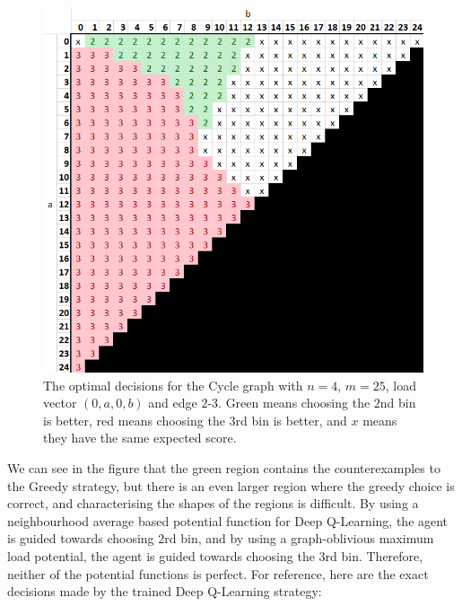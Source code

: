 \begin{figure}[hbt!] \label{greedy-counterexample-analysed}
    \centering
    \includegraphics[scale=1.0]{Chapter4/Figs/0a0b_4_25_analysis.png}
    \caption{The optimal decisions for the Cycle graph with $n=4$, $m=25$, load vector $(0,a,0,b)$ and edge $2$-$3$. Green means choosing the $2$nd bin is better, red means choosing the $3$rd bin is better, and $x$ means they have the same expected score.}
\end{figure}


We can see in the figure that the green region contains the counterexamples to the Greedy strategy, but there is an even larger region where the greedy choice is correct, and characterising the shapes of the regions is difficult. By using a neighbourhood average based potential function for Deep Q-Learning, the agent is guided towards choosing $2$rd bin, and by using a graph-oblivious maximum load potential, the agent is guided towards choosing the $3$rd bin. Therefore, neither of the potential functions is perfect. For reference, here are the exact decisions made by the trained Deep Q-Learning strategy: 


